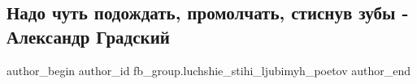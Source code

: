  
 
 
 
 
 
\subsection{Надо чуть подождать, промолчать, стиснув зубы - Александр Градский}
\label{sec:30_11_2021.fb.fb_group.luchshie_stihi_ljubimyh_poetov.1.gradskij_nado_podozhdat}
 
\ifcmt
 author_begin
   author_id fb_group.luchshie_stihi_ljubimyh_poetov
 author_end
\fi


